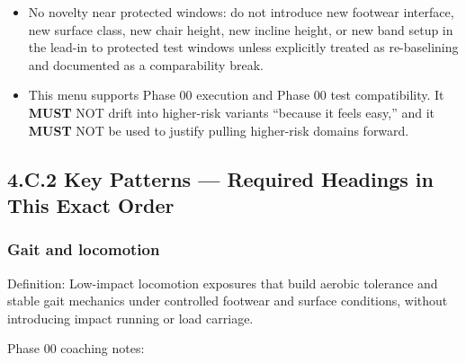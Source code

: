 \documentclass[10pt]{article}
\begin{document}
\begin{itemize}
\begin{itemize}
  \item Tests: use the applicable \textbf{TEST-RC}-\#\#\# when a test attempt becomes \textbf{INVALID}.
  \end{itemize}
\item No novelty near protected windows: do not introduce new footwear interface, new surface class, new chair height, new incline height, or new band setup in the lead-in to protected test windows unless explicitly treated as re-baselining and documented as a comparability break.
\item This menu supports Phase 00 execution and Phase 00 test compatibility. It \textbf{MUST} NOT drift into higher-risk variants “because it feels easy,” and it \textbf{MUST} NOT be used to justify pulling higher-risk domains forward.
\end{itemize}

\subsection*{4.C.2 Key Patterns — Required Headings in This Exact Order}
{}

\subsubsection*{Gait and locomotion}

Definition: Low-impact locomotion exposures that build aerobic tolerance and stable gait mechanics under controlled footwear and surface conditions, without introducing impact running or load carriage.

Phase 00 coaching notes:
\end{document}
